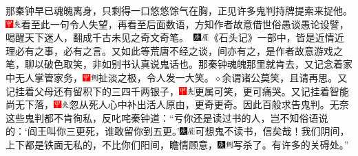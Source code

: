 {{{{{{{{{那秦钟早已魂魄离身，只剩得一口悠悠馀气在胸，正见许多鬼判持牌提索来捉他。{\includegraphics[width=3mm]{../Images/00002}\includegraphics[width=3mm]{../Images/00012}\footnotesize \kaishu 看至此一句令人失望，再看至后面数语，方知作者故意借世俗愚谈愚论设譬，喝醒天下迷人，翻成千古未见之奇文奇笔。　\includegraphics[width=3mm]{../Images/00004}\includegraphics[width=3mm]{../Images/00010}\footnotesize \kaishu 《石头记》一部中，皆是近情近理必有之事，必有之言。又如此等荒唐不经之谈，间亦有之，是作者故意游戏之笔，聊以破色取笑，非如别书认真说鬼话也。}那秦钟魂魄那里就肯去，又记念着家中无人掌管家务，{\includegraphics[width=3mm]{../Images/00002}\includegraphics[width=3mm]{../Images/00011}\footnotesize \kaishu 扯淡之极，令人发一大笑。{$\diamond$}余谓诸公莫笑，且请再思。}又记挂着父母还有留积下的三四千两银子，{\includegraphics[width=3mm]{../Images/00002}\includegraphics[width=3mm]{../Images/00012}\footnotesize \kaishu 更属可笑，更可痛哭。}又记挂着智能尚无下落，{\includegraphics[width=3mm]{../Images/00002}\includegraphics[width=3mm]{../Images/00012}\footnotesize \kaishu 忽从死人心中补出活人原由，更奇更奇。}因此百般求告鬼判。无奈这些鬼判都不肯徇私，反叱咤秦钟道：“亏你还是读过书的人，岂不知俗语说的：‘阎王叫你三更死，谁敢留你到五更。’{\includegraphics[width=3mm]{../Images/00004}\includegraphics[width=3mm]{../Images/00010}\footnotesize \kaishu 可想鬼不读书，信矣哉！}我们阴间，上下都是铁面无私的，不比你们阳间，瞻情顾意，{\includegraphics[width=3mm]{../Images/00004}\includegraphics[width=3mm]{../Images/00011}\footnotesize \kaishu 写杀了。}有许多的关碍处。”

}}}}}}}}}
